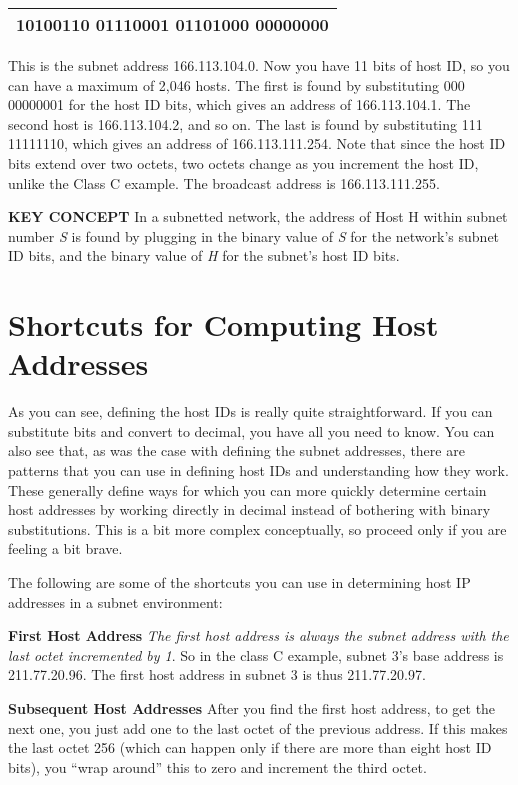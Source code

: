 \begin{longtable}[]{@{}l@{}}
\toprule
\endhead
10100110 01110001 {\textbf{01101}}{000 00000000}\tabularnewline
\bottomrule
\end{longtable}

This is the subnet address 166.113.104.0. Now you have 11 bits of host
ID, so you can have a maximum of 2,046 hosts. The first is found by
substituting 000 00000001 for the host ID bits, which gives an address
of 166.113.104.1. The second host is 166.113.104.2, and so on. The last
is found by substituting 111 11111110, which gives an address of
166.113.111.254. Note that since the host ID bits extend over two
octets, two octets change as you increment the host ID, unlike the Class
C example. The broadcast address is 166.113.111.255.


{\textbf{KEY CONCEPT}} In a subnetted network, the address of Host H
within subnet number {\emph{S}} is found by plugging in the binary value
of {\emph{S}} for the network's subnet ID bits, and the binary value of
{\emph{H}} for the subnet's host ID bits.

\section{Shortcuts for Computing Host Addresses}

\protect\hypertarget{ch19s05.htmlux5cux23idx-CHP-19-0754}{}{}\protect\hypertarget{ch19s05.htmlux5cux23idx-CHP-19-0755}{}{}As
you can see, defining the host IDs is really quite straightforward. If
you can substitute bits and convert to decimal, you have all you need to
know. You can also see that, as was the case with defining the subnet
addresses, there are patterns that you can use in defining host IDs and
understanding how they work. These generally define ways for which you
can more quickly determine certain host addresses by working directly in
decimal instead of bothering with binary substitutions. This is a bit
more complex conceptually, so proceed only if you are feeling a bit
brave.

The following are some of the shortcuts you can use in determining host
IP addresses in a subnet environment:

{\textbf{First Host Address}} {\emph{The first host address is always
the subnet address with the last octet incremented by 1}}. So in the
class C example, subnet 3's base address is 211.77.20.96. The first host
address in subnet 3 is thus 211.77.20.97.

{\textbf{Subsequent Host Addresses}} After you find the first host
address, to get the next one, you just add one to the last octet of the
previous address. If this makes the last octet 256 (which can happen
only if there are more than eight host ID bits), you ``wrap around'' this
to zero and increment the third octet.

